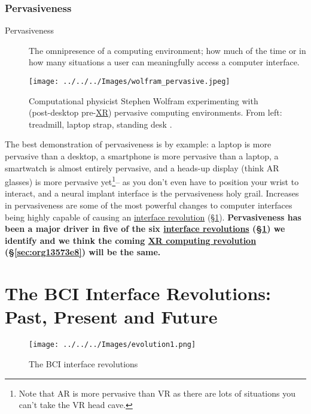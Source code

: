 \documentclass[logo,bsc,singlespacing,parskip]{infthesis}
\begin{document}
\subsection{Pervasiveness}
\label{sec:org3acd9fc}
\medskip
\begin{mdframed}
\begin{description}
\item[{Pervasiveness\label{pervasiveness}}] The omnipresence of a computing environment; how much of the time or in how many situations a user can meaningfully access a computer interface.
\end{description}
\end{mdframed}

\begin{figure}[H]
\centering
\texttt{[image: ../../../Images/wolfram\_pervasive.jpeg]}
\caption[Stephen Wolfram experimenting with pervasive computing]{Computational physicist Stephen Wolfram experimenting with (post-desktop pre-\hyperref[org1d567af]{XR}) pervasive computing environments. From left: treadmill, laptop strap, standing desk \autocite{SeekingProductiveLife}.}
\end{figure}

The best demonstration of pervasiveness is by example: a laptop is more pervasive than a desktop, a smartphone is more pervasive than a laptop, a smartwatch is almost entirely pervasive, and a heads-up display (think AR glasses) is more pervasive yet\footnote{Note that AR is more pervasive than VR as there are lots of situations you can't take the VR head cave.}-- as you don't even have to position your wrist to interact, and a neural implant interface is the pervasiveness holy grail.
Increases in pervasiveness are some of the most powerful changes to computer interfaces being highly capable of causing an \hyperref[sec:org64b3156]{interface revolution} (\S \ref{sec:org64b3156}).
\textbf{Pervasiveness has been a major driver in five of the six \hyperref[sec:org64b3156]{interface revolutions} (\S \ref{sec:org64b3156}) we identify and we think the coming \hyperref[sec:org13573e8]{XR computing revolution} (\S \ref{sec:org13573e8}) will be the same.}

\chapter{The BCI Interface Revolutions: Past, Present and Future}
\label{sec:org64b3156}
\setcounter{section}{-1}
\begin{figure}[h]
\centering
\texttt{[image: ../../../Images/evolution1.png]}
\caption{The BCI interface revolutions}
\end{figure}
\end{document}
